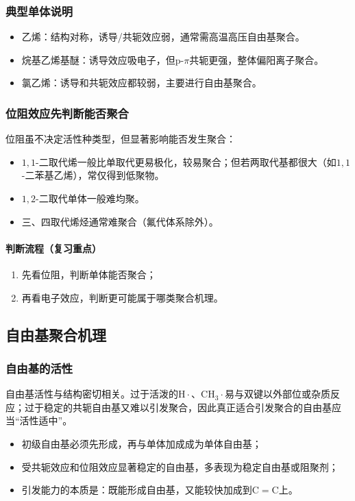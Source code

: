 ﻿\documentclass[12pt,a4paper]{article}
\begin{document}
\subsubsection{典型单体说明}
\begin{itemize}
  \item 乙烯：结构对称，诱导/共轭效应弱，通常需高温高压自由基聚合。
  \item 烷基乙烯基醚：诱导效应吸电子，但$\mathrm{p}$-$\pi$共轭更强，整体偏阳离子聚合。
  \item 氯乙烯：诱导和共轭效应都较弱，主要进行自由基聚合。
\end{itemize}

\subsubsection{位阻效应先判断能否聚合}
位阻虽不决定活性种类型，但显著影响能否发生聚合：
\begin{itemize}
  \item $1,1$-二取代烯一般比单取代更易极化，较易聚合；但若两取代基都很大（如$1,1$-二苯基乙烯），常仅得到低聚物。
  \item $1,2$-二取代单体一般难均聚。
  \item 三、四取代烯烃通常难聚合（氟代体系除外）。
\end{itemize}

\paragraph{判断流程（复习重点）}
\begin{enumerate}[1)]
  \item 先看位阻，判断单体能否聚合；
  \item 再看电子效应，判断更可能属于哪类聚合机理。
\end{enumerate}

\subsection{自由基聚合机理}
\subsubsection{自由基的活性}
自由基活性与结构密切相关。过于活泼的$\mathrm{H\cdot}$、$\mathrm{CH_3\cdot}$易与双键以外部位或杂质反应；过于稳定的共轭自由基又难以引发聚合，因此真正适合引发聚合的自由基应当“活性适中”。
\begin{itemize}
  \item 初级自由基必须先形成，再与单体加成成为单体自由基；
  \item 受共轭效应和位阻效应显著稳定的自由基，多表现为稳定自由基或阻聚剂；
  \item 引发能力的本质是：既能形成自由基，又能较快加成到$\mathrm{C=C}$上。
\end{itemize}
\end{document}
